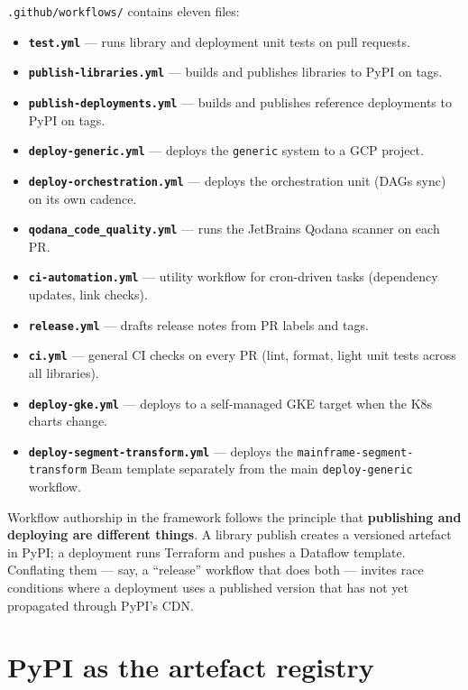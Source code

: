 \documentclass[
  11pt,
  british,
  oneside]{book}
\providecommand{\tightlist}{%
  \setlength{\itemsep}{0pt}\setlength{\parskip}{0pt}}
\begin{document}
\texttt{.github/workflows/}
contains eleven files:

\begin{itemize}
\tightlist
\item
  \textbf{\texttt{test.yml}} --- runs library and deployment unit tests
  on pull requests.
\item
  \textbf{\texttt{publish-libraries.yml}} --- builds and publishes
  libraries to PyPI on tags.
\item
  \textbf{\texttt{publish-deployments.yml}} --- builds and publishes
  reference deployments to PyPI on tags.
\item
  \textbf{\texttt{deploy-generic.yml}} --- deploys the \texttt{generic}
  system to a GCP project.
\item
  \textbf{\texttt{deploy-orchestration.yml}} --- deploys the
  orchestration unit (DAGs sync) on its own cadence.
\item
  \textbf{\texttt{qodana\_code\_quality.yml}} --- runs the JetBrains
  Qodana scanner on each PR.
\item
  \textbf{\texttt{ci-automation.yml}} --- utility workflow for
  cron-driven tasks (dependency updates, link checks).
\item
  \textbf{\texttt{release.yml}} --- drafts release notes from PR labels
  and tags.
\item
  \textbf{\texttt{ci.yml}} --- general CI checks on every PR (lint,
  format, light unit tests across all libraries).
\item
  \textbf{\texttt{deploy-gke.yml}} --- deploys to a self-managed GKE
  target when the K8s charts change.
\item
  \textbf{\texttt{deploy-segment-transform.yml}} --- deploys the
  \texttt{mainframe-segment-transform} Beam template separately from the
  main \texttt{deploy-generic} workflow.
\end{itemize}

Workflow authorship in the framework follows the principle that
\textbf{publishing and deploying are different things}. A library
publish creates a versioned artefact in PyPI; a deployment runs
Terraform and pushes a Dataflow template. Conflating them --- say, a
``release'' workflow that does both --- invites race conditions where a
deployment uses a published version that has not yet propagated through
PyPI's CDN.

\hypertarget{pypi-as-the-artefact-registry}{%
\section{PyPI as the artefact
registry}\label{pypi-as-the-artefact-registry}}
\end{document}
